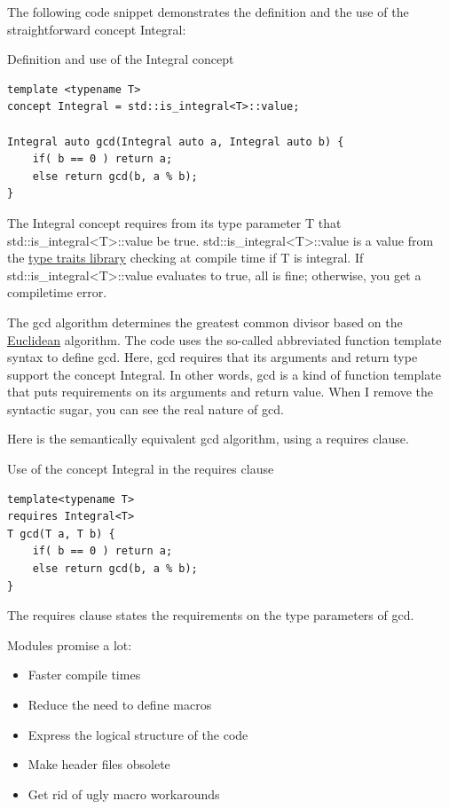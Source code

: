 The following code snippet demonstrates the definition and the use of the straightforward concept Integral:

\noindent
Definition and use of the Integral concept
\begin{lstlisting}[style=styleCXX]
template <typename T>
concept Integral = std::is_integral<T>::value;

Integral auto gcd(Integral auto a, Integral auto b) {
	if( b == 0 ) return a;
	else return gcd(b, a % b);
}
\end{lstlisting}

The Integral concept requires from its type parameter T that std::is\_integral<T>::value be true. std::is\_integral<T>::value is a value from the \href{https://en.cppreference.com/w/cpp/header/type_traits}{type traits library} checking at compile time if T is integral. If std::is\_integral<T>::value evaluates to true, all is fine; otherwise, you get a compiletime error.

The gcd algorithm determines the greatest common divisor based on the \href{https://en.wikipedia.org/wiki/Euclid}{Euclidean} algorithm. The code uses the so-called abbreviated function template syntax to define gcd. Here, gcd requires that its arguments and return type support the concept Integral. In other words, gcd is a kind of function template that puts requirements on its arguments and return value. When I remove the syntactic sugar, you can see the real nature of gcd.

Here is the semantically equivalent gcd algorithm, using a requires clause.

\noindent
Use of the concept Integral in the requires clause
\begin{lstlisting}[style=styleCXX]
template<typename T>
requires Integral<T>
T gcd(T a, T b) {
	if( b == 0 ) return a;
	else return gcd(b, a % b);
}
\end{lstlisting}

The requires clause states the requirements on the type parameters of gcd.


Modules promise a lot:

\begin{itemize}
\item 
Faster compile times

\item 
Reduce the need to define macros

\item 
Express the logical structure of the code

\item 
Make header files obsolete

\item 
Get rid of ugly macro workarounds
\end{itemize}

